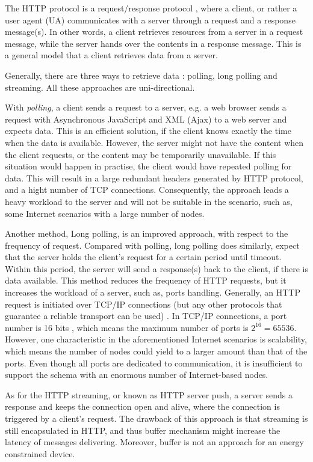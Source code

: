 The HTTP protocol is a request/response protocol \cite{fielding1999hypertext}, where a client, or rather a user agent (UA) communicates with a server through a request and a response message(s). In other words, a client retrieves resources from a server in a request message, while the server hands over the contents in a response message. This is a general model that a client retrieves data from a server. 

Generally, there are three ways to retrieve data \cite{lubbers2010html5}: polling, long polling and streaming. All these approaches are uni-directional. 

With \emph{polling}, a client sends a request to a server, e.g. a web browser sends a request with Asynchronous JavaScript and XML (Ajax) \cite{garrett2005ajax} to a web server and expects data. This is an efficient solution, if the client knows exactly the time when the data is available. However, the server might not have the content when the client requests, or the content may be temporarily unavailable. If this situation would happen in practise, the client would have repeated polling for data. This will result in a large redundant headers generated by HTTP protocol, and a hight number of TCP connections. Consequently, the approach leads a heavy workload to the server and will not be suitable in the scenario, such as, some Internet scenarios with a large number of nodes. 

Another method, Long polling, is an improved approach, with respect to the frequency of request. Compared with polling, long polling does similarly, expect that the server holds the client's request for a certain period until timeout. Within this period, the server will send a response(s) back to the client, if there is data available. This method reduces the frequency of HTTP requests, but it increases the workload of a server, such as, ports handling. Generally, an HTTP request is initiated over TCP/IP connections (but any other protocols that guarantee a reliable transport can be used) \cite {fielding1999hypertext}. In TCP/IP connections, a port number is 16 bits \cite{postel2003rfc}, which means the maximum number of ports is \(  2^{16}  = 65536 \). However, one characteristic in the aforementioned Internet scenarios is scalability, which means the number of nodes could yield to a larger amount than that of the ports. Even though all ports are dedicated to communication, it is insufficient to support the schema with an enormous number of Internet-based nodes. 

As for the HTTP streaming, or known as HTTP server push, a server sends a response and keeps the connection open and alive, where the connection is triggered by a client's request. The drawback of this approach is that streaming is still encapsulated in HTTP, and thus buffer mechanism might increase the latency of messages delivering. Moreover, buffer is not an approach for an energy constrained device.

